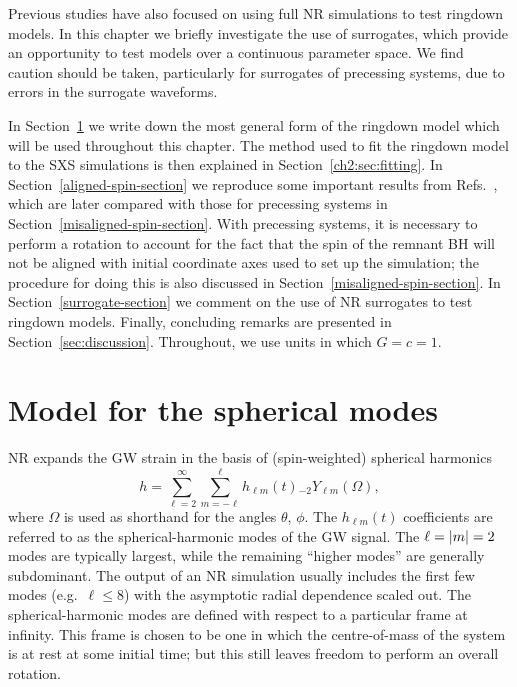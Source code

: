 Previous studies have also focused on using full NR simulations to test ringdown models. 
In this chapter we briefly investigate the use of surrogates, which provide an opportunity to test models over a continuous parameter space. 
We find caution should be taken, particularly for surrogates of precessing systems, due to errors in the surrogate waveforms.

In Section~\ref{ch2:sec:model} we write down the most general form of the ringdown model which will be used throughout this chapter.
The method used to fit the ringdown model to the SXS simulations is then explained in Section~\ref{ch2:sec:fitting}.
In Section~\ref{aligned-spin-section} we reproduce some important results from Refs.~\cite{Giesler:2019uxc, Dhani:2020nik}, which are later compared with those for precessing systems in Section~\ref{misaligned-spin-section}. 
With precessing systems, it is necessary to perform a rotation to account for the fact that the spin of the remnant BH will not be aligned with initial coordinate axes used to set up the simulation; the procedure for doing this is also discussed in Section~\ref{misaligned-spin-section}. 
In Section~\ref{surrogate-section} we comment on the use of NR surrogates to test ringdown models. 
Finally, concluding remarks are presented in Section~\ref{sec:discussion}. 
Throughout, we use units in which $G=c=1$.

\section{Model for the spherical modes}
\label{ch2:sec:model}

NR expands the GW strain in the basis of (spin-weighted) spherical harmonics
\begin{equation}\label{ch2:eq:spherical_expansion}
    h = \sum_{\ell = 2}^\infty \sum_{m = -\ell}^\ell h_{\ell m}(t) {}_{-2}Y_{\ell m}(\Omega),
\end{equation}
where $\Omega$ is used as shorthand for the angles $\theta$, $\phi$.
The $h_{\ell m}(t)$ coefficients are referred to as the spherical-harmonic modes of the GW signal.
The $\ell=\abs{m}=2$ modes are typically largest, while the remaining ``higher modes'' are generally subdominant.
The output of an NR simulation usually includes the first few modes (e.g.\ $\ell \leq 8$) with the asymptotic radial dependence scaled out.
The spherical-harmonic modes are defined with respect to a particular frame at infinity.
This frame is chosen to be one in which the centre-of-mass of the system is at rest at some initial time; but this still leaves freedom to perform an overall rotation.

